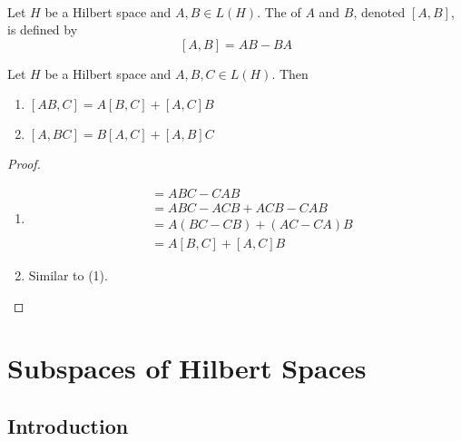 \documentclass{book}
\begin{document}
\begin{defn} \ld{} \\
	Let $H$ be a Hilbert space and $A, B \in L(H)$. The  of $A$ and $B$, denoted $[A,B]$, is defined by $$[A,B] = AB - BA$$
\end{defn}

\begin{ex} \lex{}
	Let $H$ be a Hilbert space and $A,B, C \in L(H)$. Then 
	\begin{enumerate}
		\item $[AB,C] = A[B,C] + [A,C]B$
		\item $[A, BC] = B[A, C] + [A,B]C$
	\end{enumerate}
\end{ex}

\begin{proof} \
	\begin{enumerate}
		\item 
		\begin{align*}
			[AB,C]
			&= ABC - CAB\\
			&= ABC - ACB + ACB -CAB\\
			&= A(BC - CB) + (AC-CA)B\\
			&= A[B,C] + [A,C]B
		\end{align*}
		\item Similar to (1).
	\end{enumerate}
\end{proof}



































\newpage
\section{Subspaces of Hilbert Spaces}


\subsection{Introduction}
\end{document}
